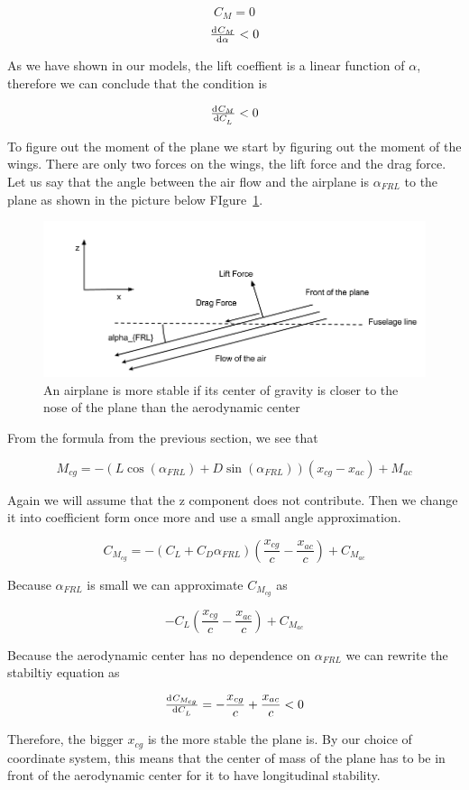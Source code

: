 \begin{equation}
C_M = 0
\end{equation}
\begin{equation}
\od{C_M}{\alpha} < 0
\label{eq:long_stability}
\end{equation}

As we have shown in our models, the lift coeffient is a linear function of $\alpha$, therefore
we can conclude that the condition is

\[\od{C_M}{C_L} < 0 \]

To figure out the moment of the plane we start by figuring out the moment of the wings.
There are only two forces on the wings, the lift force and the drag force. Let us say
that the angle between the air flow and the airplane is $\alpha_{FRL}$ to the plane as shown in the picture below 
FIgure~\ref{fig:longitudinal_stability1}.

\begin{figure}[hl]
  \centering
    \includegraphics[scale=.5]{figures/longitudinal_stability1.png}
    \caption{An airplane is more stable if its center of gravity is closer to the nose of the plane than the
    aerodynamic center}
  \label{fig:longitudinal_stability1}
\end{figure}

From the formula from the previous section, we see that 

\[M_{cg}  = -(L\cos(\alpha_{FRL}) + D\sin(\alpha_{FRL}))(x_{cg} - x_{ac}) + M_{ac}\]

Again we will assume that the z component does not contribute. Then we change it into
coefficient form once more and use a small angle approximation.

\[ C_{M_{cg}} = -(C_{L} + C_D \alpha_{FRL}) (\frac{x_{cg}}{c} - \frac{x_{ac}}{c}) + C_{M_{ac}} \]

Because $\alpha_{FRL}$ is small we can approximate $C_{M_{cg}}$ as

\[-C_L (\frac{x_{cg}}{c} - \frac{x_{ac}}{c}) + C_{M_{ac}} \]

Because the aerodynamic center has no dependence on $\alpha_{FRL}$ we can rewrite the
stabiltiy equation as

\[\od{C_{M_{cg}}}{C_L} = - \frac{x_{cg}}{c} + \frac{x_{ac}}{c} < 0\]

Therefore, the bigger $x_{cg}$ is the more stable the plane is. By our choice of coordinate system,
this means that the center of mass of the plane has to be in front of the aerodynamic center for it to have
longitudinal stability.

              

